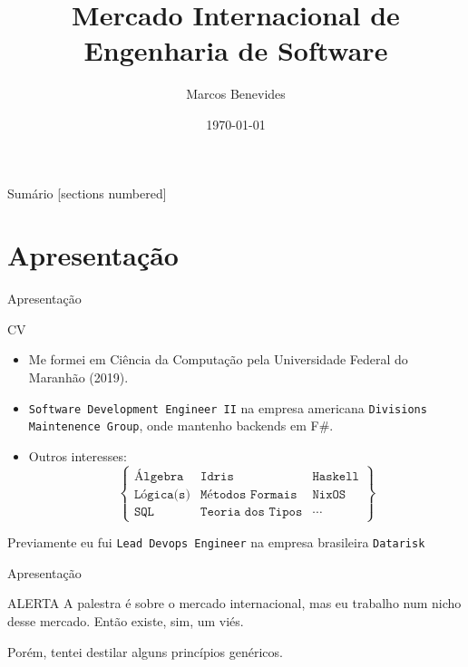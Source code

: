 \documentclass{beamer}
\title{Mercado Internacional de Engenharia de Software}
\date{\today}
\author{Marcos Benevides}
\begin{document}
  \maketitle

  \begin{frame}{Sumário}
    [sections numbered]
    \tableofcontents
  \end{frame}

  \section{Apresentação}

  \begin{frame}{Apresentação}
	\begin{block}{CV}
        \begin{itemize}[<+->]
            \item Me formei em Ciência da Computação pela Universidade Federal do Maranhão (2019).
            \item \texttt{Software Development Engineer II} na empresa americana \texttt{Divisions Maintenence Group}, onde mantenho backends em F\#.
            \item Outros interesses:
                $$
                \begin{Bmatrix}
                    \texttt{Álgebra} & \texttt{Idris} & \texttt{Haskell} \\
                    \texttt{Lógica(s)} & \texttt{Métodos Formais} & \texttt{NixOS} \\
                    \texttt{SQL} & \texttt{Teoria dos Tipos} & \cdots
                \end{Bmatrix}
                $$
        \end{itemize}
	\end{block}

    \pause[\thebeamerpauses]

    Previamente eu fui \texttt{Lead Devops Engineer} na empresa brasileira \texttt{Datarisk}
  \end{frame}

  \begin{frame}{Apresentação}

    \begin{alertblock}{ALERTA}
        A palestra é sobre o mercado internacional, mas eu trabalho num nicho desse mercado. Então existe, sim, um viés.

        Porém, tentei destilar alguns princípios genéricos.
    \end{alertblock}

  \end{frame}
\end{document}
